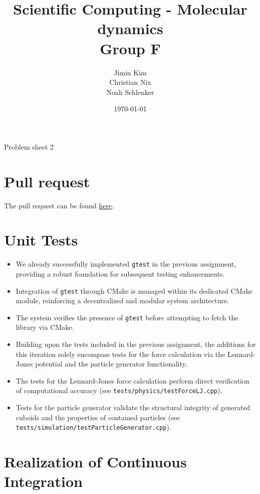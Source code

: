 \documentclass{article}
\title{Scientific Computing - Molecular dynamics \\ Group F}
\author{
    Jimin Kim \\
    Christian Nix \\
    Noah Schlenker
}
\date{\today}
\newcommand{\subtitle}{Problem sheet 2}
\begin{document}
\maketitle

\begin{center}
    \LARGE \subtitle{}
\end{center}

\section{Pull request}
\label{sec:pr}
The pull request can be found \href{https://github.com/noahpy/MolSim-SS24/pull/10}{here}.

\section{Unit Tests}
\label{sec:ut}

\begin{itemize}
    \item We already successfully implemented \verb|gtest| in the previous assignment, providing a robust foundation for subsequent testing enhancements.
    \item Integration of \verb|gtest| through CMake is managed within its dedicated CMake module, reinforcing a decentralized and modular system architecture.
    \item The system verifies the presence of \verb|gtest| before attempting to fetch the library via CMake.
    \item Building upon the tests included in the previous assignment, the additions for this iteration solely encompass tests for the force calculation via the Lennard-Jones potential and the particle generator functionality.
    \item The tests for the Lennard-Jones force calculation perform direct verification of computational accuracy (see \texttt{tests/physics/testForceLJ.cpp}).
    \item Tests for the particle generator validate the structural integrity of generated cuboids and the properties of contained particles \newline(see \texttt{tests/simulation/testParticleGenerator.cpp}).
\end{itemize}

\section{Realization of Continuous Integration}
\label{sec:ci}
\end{document}
